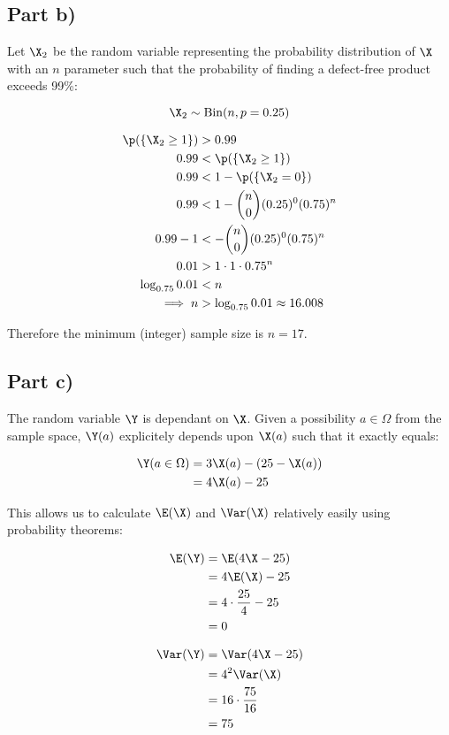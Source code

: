 \subsection*{Part b)}

Let $\X_2$ be the random variable representing the probability distribution of $\X$ with an $n$ parameter
such that the probability of finding a defect-free product exceeds 99\%:


\[
\X_2 \sim \mathrm{Bin}(n, p = 0.25)
\]

\begin{align*}
\p(\{\X_2 \geq 1\}) &> 0.99 \\
0.99 &< \p(\{ \X_2 \geq 1 \}) \\
0.99 &< 1 - \p(\{ \X_2 = 0 \}) \\
0.99 &< 1 - {n \choose 0}(0.25)^0(0.75)^n \\
0.99 - 1 &< - {n \choose 0}(0.25)^0(0.75)^n \\
0.01 &> 1 \cdot 1 \cdot 0.75^n \\
\log _{0.75} 0.01 &< n \\
\implies n &> \log _{0.75} 0.01 \approx 16.008
\end{align*}

Therefore the minimum (integer) sample size is $n = 17$.

\subsection*{Part c)}

The random variable $\Y$ is dependant on $\X$.
Given a possibility $a \in \Omega$ from the sample space, $\Y(a)$ explicitely depends upon $\X(a)$ such that it exactly equals:

\begin{align*}
\Y(a \in \Omega) &= 3\X(a) - (25 - \X(a)) \\
&= 4\X(a) - 25
\end{align*}

This allows us to calculate $\E(\X)$ and $\Var(\X)$ relatively easily using probability theorems:

\begin{align*}
\E(\Y) &= \E(4\X - 25) \\
&= 4\E(\X) - 25 \\
&= 4 \cdot \frac{25}{4} - 25 \\
&= 0
\end{align*}

\begin{align*}
\Var(\Y) &= \Var(4\X - 25) \\
&= 4^2 \Var(\X) \\
&= 16 \cdot \frac{75}{16} \\
&= 75
\end{align*}


